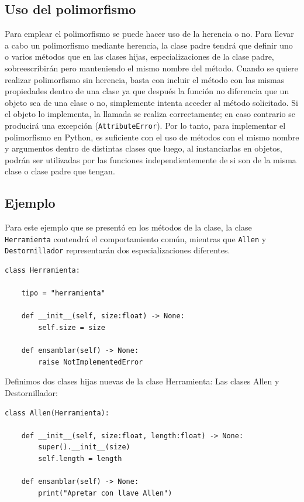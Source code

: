 \documentclass[11pt,a5paper,twoside]{book}
\begin{document}
\subsection{Uso del polimorfismo}
Para emplear el polimorfismo se puede hacer uso de la herencia o no. Para llevar a cabo un polimorfismo mediante herencia, la clase padre tendrá que definir uno o varios métodos que en las clases hijas, especializaciones de la clase padre, sobreescribirán pero manteniendo el mismo nombre del método.
Cuando se quiere realizar polimorfismo sin herencia, basta con incluir el método con las mismas propiedades dentro de una clase ya que después la función no diferencia que un objeto sea de una clase o no, simplemente intenta acceder al método solicitado. Si el objeto lo implementa, la llamada se realiza correctamente; en caso contrario se producirá una excepción ({\scriptsize \texttt{AttributeError}}).
Por lo tanto, para implementar el polimorfismo en Python, es suficiente con el uso de métodos con el mismo nombre y argumentos dentro de distintas clases que luego, al instanciarlas en objetos, podrán ser utilizadas por las funciones independientemente de si son de la misma clase o clase padre que tengan.
\subsection{Ejemplo}
Para este ejemplo que se presentó en los métodos de la clase, la clase {\scriptsize \texttt{Herramienta}} contendrá el comportamiento común, mientras que {\scriptsize \texttt{Allen}} y {\scriptsize \texttt{Destornillador}} representarán dos especializaciones diferentes.

\newpage


\begin{tcolorbox}
\scriptsize
 \begin{verbatim}
class Herramienta:

    tipo = "herramienta"
    
    def __init__(self, size:float) -> None:
        self.size = size

    def ensamblar(self) -> None:
        raise NotImplementedError
\end{verbatim}
\end{tcolorbox}
Definimos dos clases hijas nuevas de la clase Herramienta: Las clases Allen y Destornillador:


\begin{tcolorbox}
\scriptsize
 \begin{verbatim}
class Allen(Herramienta):

    def __init__(self, size:float, length:float) -> None:
        super().__init__(size)
        self.length = length

    def ensamblar(self) -> None:
        print("Apretar con llave Allen")
\end{verbatim}
\end{tcolorbox}
\end{document}
